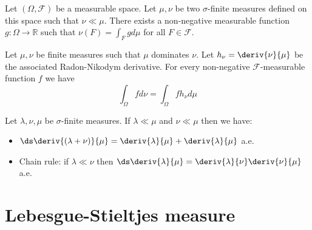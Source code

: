     
    \begin{theorem}
		Let $(\Omega,\mathcal{F})$ be a measurable space. Let $\mu,\nu$ be two $\sigma$-finite measures defined on this space such that $\nu\ll\mu$. There exists a non-negative measurable function $g:\Omega\rightarrow\mathbb{R}$ such that $\nu(F) = \int_F gd\mu$ for all $F\in\mathcal{F}$.
	\end{theorem}
    
    \begin{property}
		Let $\mu, \nu$ be finite measures such that $\mu$ dominates $\nu$. Let $h_\nu = \deriv{\nu}{\mu}$ be the associated Radon-Nikodym derivative. For every non-negative $\mathcal{F}$-measurable function $f$ we have
        \begin{equation}
			\int_\Omega fd\nu = \int_\Omega fh_\nu d\mu
		\end{equation}
	\end{property}
    
    \begin{property}
    	Let $\lambda,\nu,\mu$ be $\sigma$-finite measures. If $\lambda\ll\mu$ and $\nu\ll\mu$ then we have:
        \begin{itemize}
        	\item $\ds\deriv{(\lambda+\nu)}{\mu} = \deriv{\lambda}{\mu} + \deriv{\lambda}{\mu}$ a.e.
            \item Chain rule: if $\lambda\ll\nu$ then $\ds\deriv{\lambda}{\mu} = \deriv{\lambda}{\nu}\deriv{\nu}{\mu}$ a.e.
        \end{itemize}
    \end{property}
    
\section{Lebesgue-Stieltjes measure}